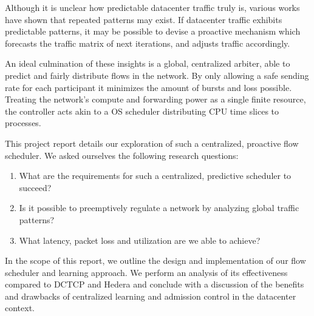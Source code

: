 Although it is unclear how predictable datacenter traffic truly is, various 
works have shown that repeated patterns may 
exist.\cite{msr_dc,fb_dc,traffic,microte}
If datacenter traffic exhibits predictable patterns, it may be 
possible to devise a proactive mechanism which forecasts the traffic matrix of 
next iterations, and adjusts traffic accordingly.

An ideal culmination of these insights is a global, 
centralized arbiter, able to predict and fairly distribute flows in the 
network. By only allowing a safe sending rate for each participant it minimizes 
the amount of bursts and loss possible.
Treating the network's compute and forwarding power as a single finite 
resource, the controller acts akin to a OS scheduler distributing CPU time 
slices to processes.

This project report details our exploration of such a centralized, 
proactive flow scheduler. We asked ourselves the following research questions:
\begin{enumerate}
    \item What are the requirements for such a centralized, predictive 
    scheduler to succeed?
    \item Is it possible to preemptively regulate a network by analyzing global 
    traffic patterns?
    \item What latency, packet loss and utilization are we able to achieve?
\end{enumerate}
In the scope of this report, we outline the design and implementation of our 
flow scheduler and learning approach. We perform an analysis of its 
effectiveness compared to DCTCP and Hedera and conclude with a discussion of 
the benefits and drawbacks of centralized learning and admission control in the 
datacenter context.
